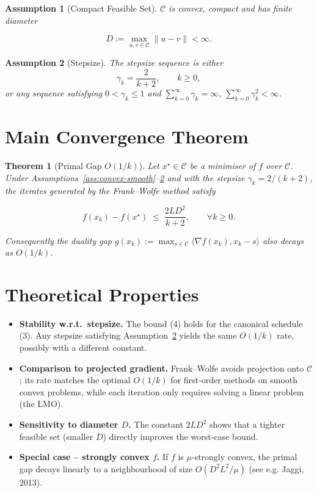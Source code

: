 \documentclass{article}
\newtheorem{theorem}{Theorem}
\newtheorem{assumption}{Assumption}
\begin{document}
\begin{assumption}[Compact Feasible Set]\label{ass:compact}
$\mathcal C$ is convex, compact and has finite diameter  

\[
D:=\max_{u,v\in\mathcal C}\|u-v\|<\infty .
\]
\end{assumption}

\begin{assumption}[Stepsize]\label{ass:stepsize}
The stepsize sequence is either
\[
\gamma_k = \frac{2}{k+2},\qquad k\ge0,
\tag{3}
\]
or any sequence satisfying $0<\gamma_k\le 1$ and $\sum_{k=0}^{\infty}\gamma_k =\infty$, $\sum_{k=0}^{\infty}\gamma_k^2<\infty$.
\end{assumption}

\section*{Main Convergence Theorem}
\begin{theorem}[Primal Gap $O(1/k)$]\label{thm:fw-rate}
Let $x^\star\in\mathcal C$ be a minimiser of $f$ over $\mathcal C$.  
Under Assumptions~\ref{ass:convex-smooth}–\ref{ass:stepsize} and with the stepsize $\gamma_k=2/(k+2)$,
the iterates generated by the Frank–Wolfe method satisfy  

\[
f(x_k)-f(x^\star)\;\le\;\frac{2L D^{2}}{k+2},
\qquad\forall k\ge0 .
\tag{4}
\]

Consequently the duality gap $g(x_k):=\max_{s\in\mathcal C}\langle\nabla f(x_k),x_k-s\rangle$ also decays as $O(1/k)$.
\end{theorem}

\section*{Theoretical Properties}
\begin{itemize}
\item \textbf{Stability w.r.t.\ stepsize.} The bound (4) holds for the canonical schedule (3). Any stepsize satisfying Assumption~\ref{ass:stepsize} yields the same $O(1/k)$ rate, possibly with a different constant.
\item \textbf{Comparison to projected gradient.} Frank–Wolfe avoids projection onto $\mathcal C$; its rate matches the optimal $O(1/k)$ for first‑order methods on smooth convex problems, while each iteration only requires solving a linear problem (the LMO).
\item \textbf{Sensitivity to diameter $D$.} The constant $2LD^{2}$ shows that a tighter feasible set (smaller $D$) directly improves the worst‑case bound.
\item \textbf{Special case – strongly convex $f$.} If $f$ is $\mu$‑strongly convex, the primal gap decays linearly to a neighbourhood of size $O(D^{2}L^{2}/\mu)$ (see e.g. Jaggi, 2013). 
\end{itemize}
\end{document}

